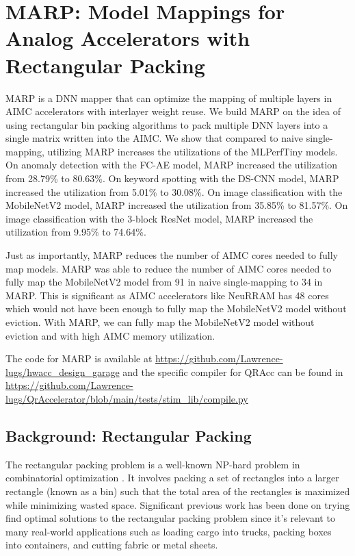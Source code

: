 \chapter{MARP: Model Mappings for Analog Accelerators with Rectangular Packing}

MARP is a DNN mapper that can optimize the mapping of multiple layers in AIMC accelerators with interlayer weight reuse. We build MARP on the idea of using rectangular bin packing algorithms to pack multiple DNN layers into a single matrix written into the AIMC. We show that compared to naive single-mapping, utilizing MARP increases the utilizations of the MLPerfTiny models. On anomaly detection with the FC-AE model, MARP increased the utilization from 28.79\% to 80.63\%. On keyword spotting with the DS-CNN model, MARP increased the utilization from 5.01\% to 30.08\%. On image classification with the MobileNetV2 model, MARP increased the utilization from 35.85\% to 81.57\%. On image classification with the 3-block ResNet model, MARP increased the utilization from 9.95\% to 74.64\%.

Just as importantly, MARP reduces the number of AIMC cores needed to fully map models. MARP was able to reduce the number of AIMC cores needed to fully map the MobileNetV2 model from 91 in naive single-mapping to 34 in MARP. This is significant as AIMC accelerators like NeuRRAM \cite{wanneurram} has 48 cores which would not have been enough to fully map the MobileNetV2 model without eviction. With MARP, we can fully map the MobileNetV2 model without eviction and with high AIMC memory utilization.

The code for MARP is available at \url{https://github.com/Lawrence-lugs/hwacc_design_garage} and the specific compiler for QRAcc can be found in \url{https://github.com/Lawrence-lugs/QrAccelerator/blob/main/tests/stim_lib/compile.py}

\label{chapter:marp}

\section{Background: Rectangular Packing}

The rectangular packing problem is a well-known NP-hard problem in combinatorial optimization \cite{jylanki2010thousand}. It involves packing a set of rectangles into a larger rectangle (known as a bin) such that the total area of the rectangles is maximized while minimizing wasted space. Significant previous work has been done on trying find optimal solutions to the rectangular packing problem since it's relevant to many real-world applications such as loading cargo into trucks, packing boxes into containers, and cutting fabric or metal sheets. 

